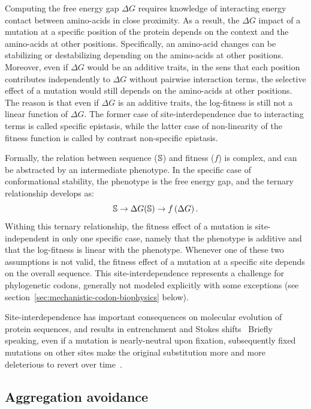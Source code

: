 Computing the free energy gap $\Delta G$ requires knowledge of interacting energy contact between amino-acids in close proximity.
As a result, the $\Delta G$ impact of a mutation at a specific position of the protein depends on the context and the amino-acids at other positions.
Specifically, an amino-acid changes can be stabilizing or destabilizing depending on the amino-acids at other positions.
Moreover, even if $\Delta G$ would be an additive traits, in the sens that each position contributes independently to $\Delta G$ without pairwise interaction terms, the selective effect of a mutation would still depends on the amino-acids at other positions.
The reason is that even if $\Delta G$ is an additive traits, the log-fitness is still not a linear function of $\Delta G$.
The former case of site-interdependence due to interacting terms is called specific epistasis, while the latter case of non-linearity of the fitness function is called by contrast non-specific epistasis.

Formally, the relation between sequence ($\mathbb{S}$) and fitness ($f$) is complex, and can be abstracted by an intermediate phenotype.
In the specific case of conformational stability, the phenotype is the free energy gap, and the ternary relationship develops as:
\begin{equation}
    \mathbb{S} \rightarrow \Delta G (\mathbb{S}) \rightarrow f \left( \Delta G \right).
\end{equation}
Withing this ternary relationship, the fitness effect of a mutation is site-independent in only one specific case, namely that the phenotype is additive and that the log-fitness is linear with the phenotype.
Whenever one of these two assumptions is not valid, the fitness effect of a mutation at a specific site depends on the overall sequence.
This site-interdependence represents a challenge for phylogenetic codons, generally not modeled explicitly with some exceptions (see section~\ref{sec:mechanistic-codon-biophysics} below).

Site-interdependence has important consequences on molecular evolution  of protein sequences, and results in entrenchment and Stokes shifts~\citep{Pollock2012, Shah2015}
Briefly speaking, even if a mutation is nearly-neutral upon fixation, subsequently fixed mutations on other sites make the original substitution more and more deleterious to revert over time~\citep{Lunzer2010, Naumenko2012, Mccandlish2013}.

\subsection{Aggregation avoidance}

